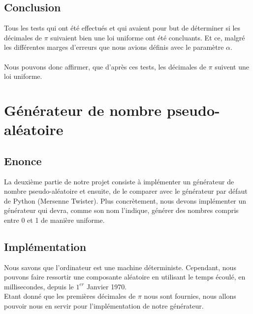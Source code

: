 \documentclass[french]{article}
\begin{document}
\subsection{Conclusion}
Tous les tests qui ont été effectués et qui avaient pour but de déterminer si les décimales de $\pi$ suivaient bien une loi uniforme ont été concluants. Et ce, malgré les différentes marges d'erreurs que nous avions définis avec le paramètre $\alpha$.
\\
\\
Nous pouvons donc affirmer, que d'après ces tests, les décimales de $\pi$ suivent une loi uniforme.

\section{Générateur de nombre pseudo-aléatoire}
\subsection{Enonce}
La deuxième partie de notre projet consiste à implémenter un générateur de nombre pseudo-aléatoire et ensuite, de le comparer avec le générateur par défaut de Python (Mersenne Twister). Plus concrètement, nous devons implémenter un générateur qui devra, comme son nom l'indique, générer des nombres compris entre 0 et 1
de manière uniforme.

\subsection{Implémentation}
Nous savons que l'ordinateur est une machine déterministe. Cependant, nous pouvons faire ressortir une composante aléatoire en utilisant le temps écoulé, en millisecondes, depuis le $1^{er}$ Janvier 1970.
\\
Etant donné que les premières décimales de  $\pi$ nous sont fournies, nous allons pouvoir nous en servir pour l'implémentation de notre générateur.
\end{document}
